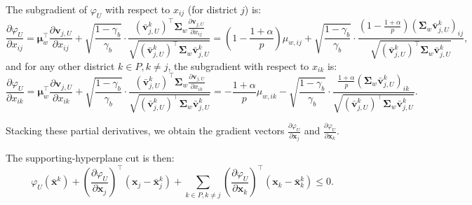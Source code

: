 \documentclass[preprint,12pt,authoryear]{elsarticle}
\begin{document}
The subgradient of $\varphi_U$ with respect to $x_{ij}$ (for district $j$) is:
\begin{equation}
\frac{\partial \varphi_U}{\partial x_{ij}} = \boldsymbol{\mu}_w^\top \frac{\partial \mathbf{v}_{j,U}}{\partial x_{ij}} + \sqrt{\frac{1-\gamma_b}{\gamma_b}} \cdot \frac{(\bar{\mathbf{v}}_{j,U}^k)^\top \boldsymbol{\Sigma}_w \frac{\partial \mathbf{v}_{j,U}}{\partial x_{ij}}}{\sqrt{(\bar{\mathbf{v}}_{j,U}^k)^\top \boldsymbol{\Sigma}_w \bar{\mathbf{v}}_{j,U}^k}} = \left(1 - \frac{1+\alpha}{p}\right) \mu_{w,ij} + \sqrt{\frac{1-\gamma_b}{\gamma_b}} \cdot \frac{\left(1 - \frac{1+\alpha}{p}\right) (\boldsymbol{\Sigma}_w \bar{\mathbf{v}}_{j,U}^k)_{ij}}{\sqrt{(\bar{\mathbf{v}}_{j,U}^k)^\top \boldsymbol{\Sigma}_w \bar{\mathbf{v}}_{j,U}^k}},
\label{eq:assign_dep_rel_d1_subgradient_U_ij}
\end{equation}
and for any other district $k \in P, k \neq j$, the subgradient with respect to $x_{ik}$ is:
\begin{equation}
\frac{\partial \varphi_U}{\partial x_{ik}} = \boldsymbol{\mu}_w^\top \frac{\partial \mathbf{v}_{j,U}}{\partial x_{ik}} + \sqrt{\frac{1-\gamma_b}{\gamma_b}} \cdot \frac{(\bar{\mathbf{v}}_{j,U}^k)^\top \boldsymbol{\Sigma}_w \frac{\partial \mathbf{v}_{j,U}}{\partial x_{ik}}}{\sqrt{(\bar{\mathbf{v}}_{j,U}^k)^\top \boldsymbol{\Sigma}_w \bar{\mathbf{v}}_{j,U}^k}} = -\frac{1+\alpha}{p} \mu_{w,ik} - \sqrt{\frac{1-\gamma_b}{\gamma_b}} \cdot \frac{\frac{1+\alpha}{p} (\boldsymbol{\Sigma}_w \bar{\mathbf{v}}_{j,U}^k)_{ik}}{\sqrt{(\bar{\mathbf{v}}_{j,U}^k)^\top \boldsymbol{\Sigma}_w \bar{\mathbf{v}}_{j,U}^k}}.
\label{eq:assign_dep_rel_d1_subgradient_U_ik}
\end{equation}

Stacking these partial derivatives, we obtain the gradient vectors $\frac{\partial \varphi_U}{\partial \mathbf{x}_j}$ and $\frac{\partial \varphi_U}{\partial \mathbf{x}_k}$.

The supporting-hyperplane cut is then:
\begin{equation}
\varphi_U(\bar{\mathbf{x}}^k) + \left(\frac{\partial \varphi_U}{\partial \mathbf{x}_j}\right)^\top (\mathbf{x}_j - \bar{\mathbf{x}}_j^k) + \sum_{k \in P, k \neq j} \left(\frac{\partial \varphi_U}{\partial \mathbf{x}_k}\right)^\top (\mathbf{x}_k - \bar{\mathbf{x}}_k^k) \leqslant 0.
\label{eq:assign_dep_rel_balance_d1_supporting_cut_upper}
\end{equation}
\end{document}
